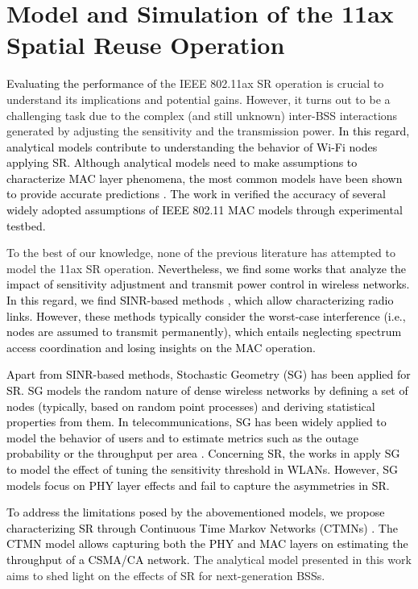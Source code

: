 \documentclass[preprint,12pt]{elsarticle}
\begin{document}
\section{Model and Simulation of the 11ax Spatial Reuse Operation}
\label{section:analytical_model}

\textcolor{black}{Evaluating the performance of} the IEEE 802.11ax SR operation is crucial to understand its implications and potential gains. However, it turns out to be a challenging task due to the complex (and still unknown) inter-BSS interactions generated by adjusting the sensitivity and the transmission power. \textcolor{black}{In this regard, analytical models contribute to understanding the behavior of Wi-Fi nodes applying SR. Although analytical models need to make assumptions to characterize MAC layer phenomena, the most common models have been shown to provide accurate predictions \cite{malone2007verification, huang2010validity}. The work in \cite{malone2007verification} verified the accuracy of several widely adopted assumptions of IEEE 802.11 MAC models through experimental testbed.}

To the best of our knowledge, none of the previous literature has attempted to model the 11ax SR operation. \textcolor{black}{Nevertheless, we find some works that analyze the impact of sensitivity adjustment and transmit power control in wireless networks. In this regard, we find SINR-based methods \cite{gupta2000capacity, guo2003spatial}, which allow characterizing radio links. However, these methods typically consider the worst-case interference (i.e., nodes are assumed to transmit permanently), which entails neglecting spectrum access coordination and losing insights on the MAC operation.}

\textcolor{black}{Apart from SINR-based methods, Stochastic Geometry (SG) has been applied for SR. SG models the random nature of dense wireless networks by defining a set of nodes (typically, based on random point processes) and deriving statistical properties from them. In telecommunications, SG has been widely applied to model the behavior of users and to estimate metrics such as the outage probability or the throughput per area \cite{elsawy2016modeling}. Concerning SR, the works in \cite{zhao2016stochastic, zhang2015stochastic, iwata2019stochastic} apply SG to model the effect of tuning the sensitivity threshold in WLANs. However, SG models focus on PHY layer effects and fail to capture the asymmetries in SR.}

\textcolor{black}{To address the limitations posed by the abovementioned models, we propose characterizing SR through Continuous Time Markov Networks (CTMNs) \cite{bellalta2014throughput, bellalta2017throughput}. The CTMN model allows capturing both the PHY and MAC layers on estimating the throughput of a CSMA/CA network.} The analytical model presented in this work aims to shed light on the effects of SR for next-generation BSSs.
\end{document}

